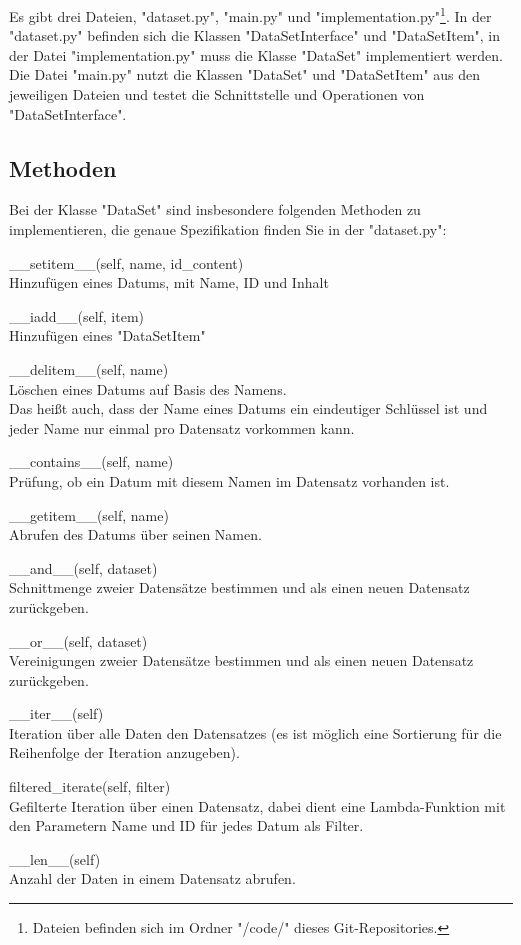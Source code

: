 \documentclass[oneside, 10pt, a4paper, parskip=full]{scrartcl}
\begin{document}
Es gibt drei Dateien, "dataset.py", "main.py" und "implementation.py"\footnote[1]{Dateien befinden sich im Ordner "/code/" dieses Git-Repositories.}.
In der "dataset.py" befinden sich die Klassen "DataSetInterface" und "DataSetItem",
in der Datei "implementation.py" muss die Klasse "DataSet" implementiert werden.
Die Datei "main.py" nutzt die Klassen "DataSet" und "DataSetItem" aus den jeweiligen Dateien und testet die Schnittstelle und Operationen von "DataSetInterface".

\subsection{Methoden}

Bei der Klasse "DataSet" sind insbesondere folgenden Methoden zu implementieren, die genaue Spezifikation finden Sie in der "dataset.py":
\begin{compactitem}
\item \_\_setitem\_\_(self, name, id\_content)\\
      Hinzufügen eines Datums, mit Name, ID und Inhalt
\item \_\_iadd\_\_(self, item)\\
      Hinzufügen eines "DataSetItem"
\item \_\_delitem\_\_(self, name)\\
      Löschen eines Datums auf Basis des Namens.\\
      Das heißt auch, dass der Name eines Datums ein eindeutiger Schlüssel ist und jeder Name nur einmal pro Datensatz vorkommen kann.
\item \_\_contains\_\_(self, name)\\
      Prüfung, ob ein Datum mit diesem Namen im Datensatz vorhanden ist.
\item \_\_getitem\_\_(self, name)\\
      Abrufen des Datums über seinen Namen.
\item \_\_and\_\_(self, dataset)\\
      Schnittmenge zweier Datensätze bestimmen und als einen neuen Datensatz zurückgeben.
\item \_\_or\_\_(self, dataset)\\
      Vereinigungen zweier Datensätze bestimmen und als einen neuen Datensatz zurückgeben.
\item \_\_iter\_\_(self)\\
      Iteration über alle Daten den Datensatzes (es ist möglich eine Sortierung für die Reihenfolge der Iteration anzugeben).
\item filtered\_iterate(self, filter)\\
      Gefilterte Iteration über einen Datensatz, dabei dient eine Lambda-Funktion mit den Parametern Name und ID für jedes Datum als Filter.
\item \_\_len\_\_(self)\\
      Anzahl der Daten in einem Datensatz abrufen.
\end{compactitem}
\end{document}
